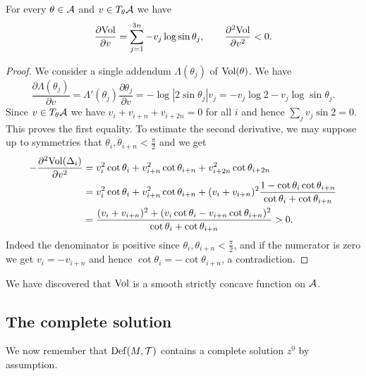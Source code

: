 \begin{prop} \label{derivative:Vol:prop}
For every $\theta \in \mathcal{A}$ and $v\in T_\theta  \mathcal{A}$ we have 
$$\frac{\partial {\rm Vol}}{\partial v} = \sum_{j=1}^{3n} -v_j \log \sin \theta_j, \qquad 
\frac{\partial^2 {\rm Vol}}{\partial v^2} < 0.$$
\end{prop}
\begin{proof}
We consider a single addendum $\Lambda(\theta_j)$ of ${\rm Vol}(\theta)$. We have
$$\frac{\partial \Lambda(\theta_j)}{\partial v} = 
\Lambda'(\theta_j) \frac{\partial \theta_j}{\partial v}
= - \log |2\sin \theta_j| v_j = -v_j\log 2 - v_j\log\sin \theta_j. $$
Since $v\in T_\theta \mathcal{A}$ we have $v_i+v_{i+n}+v_{i+2n}=0$ for all $i$ and hence $\sum_j v_j\sin 2=0$. This proves the first equality. To estimate the second derivative, we may suppose up to symmetries that $\theta_i, \theta_{i+n} < \frac \pi 2$ and we get
\begin{align*}
-\frac {\partial^2 {\rm Vol}(\Delta_i)}{\partial v^2} 
& = v_i^2 \cot \theta_i + v_{i+n}^2 \cot \theta_{i+n} + v_{i+2n}^2 \cot \theta_{i+2n} \\
& = v_i^2 \cot \theta_i + v_{i+n}^2 \cot \theta_{i+n} + 
(v_i+v_{i+n})^2 \frac{1-\cot \theta_i\cot\theta_{i+n}}{\cot \theta_i + \cot \theta_{i+n}} \\
& = \frac{(v_i+v_{i+n})^2 + (v_i\cot\theta_i - v_{i+n}\cot\theta_{i+n})^2}
{\cot \theta_i + \cot \theta_{i+n}} > 0.
\end{align*}
Indeed the denominator is positive since $\theta_i, \theta_{i+n} < \frac \pi 2$, and if the numerator is zero we get $v_i=-v_{i+n}$ and hence $\cot \theta_i = -\cot \theta_{i+n}$, a contradiction.
\end{proof}

We have discovered that ${\rm Vol}$ is a smooth strictly concave function on $\mathcal{A}$. 

\subsection{The complete solution}
We now remember that ${\rm Def}(M,\mathcal{T})$ contains a complete solution $z^0$ by assumption.

